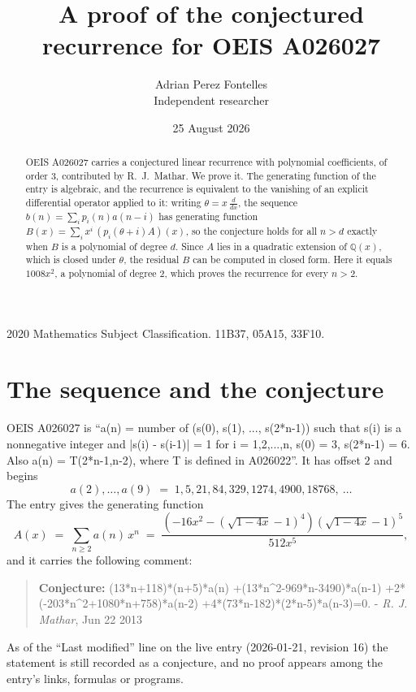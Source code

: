 \documentclass[11pt,a4paper]{article}
\title{A proof of the conjectured recurrence for OEIS A026027}
\author{Adrian Perez Fontelles\\ \small Independent researcher}
\date{25 August 2026}
\theoremstyle{plain}
\theoremstyle{definition}
\begin{document}
\maketitle

\begin{abstract}
OEIS A026027 carries a conjectured linear recurrence with polynomial coefficients, of
order 3, contributed by R.~J.~Mathar. We prove it. The generating function of the
entry is algebraic, and the recurrence is equivalent to the vanishing of an explicit
differential operator applied to it: writing $\theta=x\,\frac{d}{dx}$, the sequence
$b(n)=\sum_{i}p_{i}(n)a(n-i)$ has generating function
$B(x)=\sum_{i}x^{i}\,(p_{i}(\theta+i)A)(x)$, so the conjecture holds for all $n>d$ exactly
when $B$ is a polynomial of degree $d$. Since $A$ lies in a quadratic extension of
$\mathbb{Q}(x)$, which is closed under $\theta$, the residual $B$ can be computed in
closed form. Here it equals $1008 x^{2}$, a polynomial of degree $2$, which proves
the recurrence for every $n>2$.
\end{abstract}

\noindent\small 2020 Mathematics Subject Classification. 11B37, 05A15, 33F10.\normalsize

\section{The sequence and the conjecture}

OEIS A026027 is ``a(n) = number of (s(0), s(1), ..., s(2*n-1)) such that s(i) is a nonnegative integer and |s(i) - s(i-1)| = 1 for i = 1,2,...,n, s(0) = 3, s(2*n-1) = 6. Also a(n) = T(2*n-1,n-2), where T is defined in A026022''. It has offset $2$ and begins
\[
a(2),\dots,a(9)\;=\;1, 5, 21, 84, 329, 1274, 4900, 18768,\ \dots
\]
The entry gives the generating function
\begin{equation}\label{eq:gf}
A(x)\;=\;\sum_{n\ge 2} a(n)\,x^{n}\;=\;\frac{\left(- 16 x^{2} - \left(\sqrt{1 - 4 x} - 1\right)^{4}\right) \left(\sqrt{1 - 4 x} - 1\right)^{5}}{512 x^{5}} ,
\end{equation}
and it carries the following comment:
\begin{quote}\small
\textbf{Conjecture:} (13*n+118)*(n+5)*a(n) +(13*n\^{}2-969*n-3490)*a(n-1) +2*(-203*n\^{}2+1080*n+758)*a(n-2) +4*(73*n-182)*(2*n-5)*a(n-3)=0. - \emph{R. J. Mathar}, Jun 22 2013
\end{quote}
As of the ``Last modified'' line on the live entry (2026-01-21, revision 16) the
statement is still recorded as a conjecture, and no proof appears among the entry's links,
formulas or programs.
\end{document}
